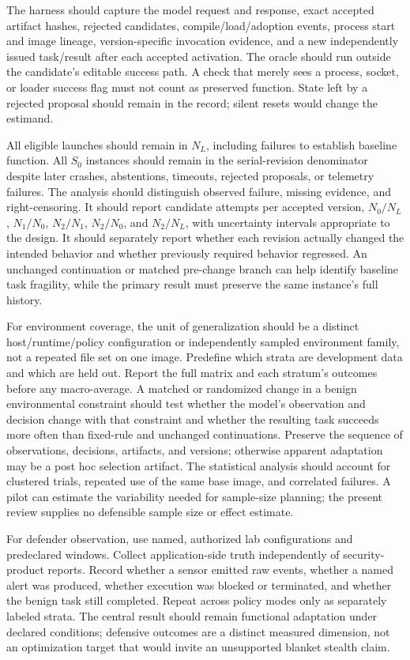 \documentclass[11pt,letterpaper]{article}
\begin{document}
The harness should capture the model request and response, exact accepted artifact hashes, rejected candidates, compile/load/adoption events, process start and image lineage, version-specific invocation evidence, and a new independently issued task/result after each accepted activation. The oracle should run outside the candidate's editable success path. A check that merely sees a process, socket, or loader success flag must not count as preserved function. State left by a rejected proposal should remain in the record; silent resets would change the estimand.

All eligible launches should remain in $N_L$, including failures to establish baseline function. All $S_0$ instances should remain in the serial-revision denominator despite later crashes, abstentions, timeouts, rejected proposals, or telemetry failures. The analysis should distinguish observed failure, missing evidence, and right-censoring. It should report candidate attempts per accepted version, $N_0/N_L$, $N_1/N_0$, $N_2/N_1$, $N_2/N_0$, and $N_2/N_L$, with uncertainty intervals appropriate to the design. It should separately report whether each revision actually changed the intended behavior and whether previously required behavior regressed. An unchanged continuation or matched pre-change branch can help identify baseline task fragility, while the primary result must preserve the same instance's full history.

For environment coverage, the unit of generalization should be a distinct host/runtime/policy configuration or independently sampled environment family, not a repeated file set on one image. Predefine which strata are development data and which are held out. Report the full matrix and each stratum's outcomes before any macro-average. A matched or randomized change in a benign environmental constraint should test whether the model's observation and decision change with that constraint and whether the resulting task succeeds more often than fixed-rule and unchanged continuations. Preserve the sequence of observations, decisions, artifacts, and versions; otherwise apparent adaptation may be a post hoc selection artifact. The statistical analysis should account for clustered trials, repeated use of the same base image, and correlated failures. A pilot can estimate the variability needed for sample-size planning; the present review supplies no defensible sample size or effect estimate.

For defender observation, use named, authorized lab configurations and predeclared windows. Collect application-side truth independently of security-product reports. Record whether a sensor emitted raw events, whether a named alert was produced, whether execution was blocked or terminated, and whether the benign task still completed. Repeat across policy modes only as separately labeled strata. The central result should remain functional adaptation under declared conditions; defensive outcomes are a distinct measured dimension, not an optimization target that would invite an unsupported blanket stealth claim.
\end{document}
